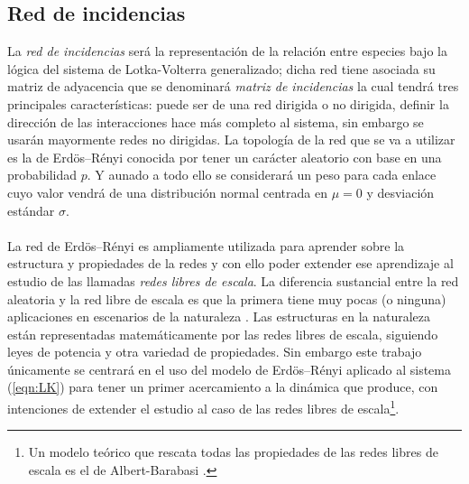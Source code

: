 \subsection{Red de incidencias}

La \textit{red de incidencias} será la representación de la relación entre especies bajo la lógica del sistema de Lotka-Volterra generalizado; dicha red tiene asociada su matriz de adyacencia que se denominará \textit{matriz de incidencias} la cual tendrá tres principales características: puede ser de una red dirigida o no dirigida, definir la dirección de las interacciones hace más completo al sistema, sin embargo se usarán mayormente redes no dirigidas. La topología de la red que se va a utilizar es la de Erdös–Rényi \cite{posfai2016network} conocida por tener un carácter aleatorio con base en una probabilidad $p$. Y aunado a todo ello se considerará un peso para cada enlace cuyo valor vendrá de una distribución normal centrada en $\mu=0$ y desviación estándar $\sigma$.\\
\\
La red de Erdös–Rényi es ampliamente utilizada para aprender sobre la estructura y propiedades de la redes y con ello poder extender ese aprendizaje al estudio de las llamadas \textit{redes libres de escala}. La diferencia sustancial entre la red aleatoria y la red libre de escala es que la primera tiene muy pocas (o ninguna) aplicaciones en escenarios de la naturaleza \cite{posfai2016network}. Las estructuras en la naturaleza están representadas matemáticamente por las redes libres de escala, siguiendo leyes de potencia y otra variedad de propiedades. Sin embargo este trabajo únicamente se centrará en el uso del modelo de Erdös–Rényi aplicado al sistema (\ref{eqn:LK}) para tener un primer acercamiento a la dinámica que produce, con intenciones de extender el estudio al caso de las redes libres de escala\footnote{Un modelo teórico que rescata todas las propiedades de las redes libres de escala es el de Albert-Barabasi \cite{posfai2016network}.}. 
